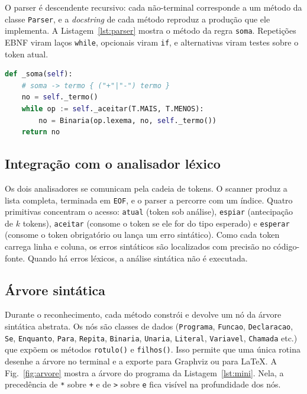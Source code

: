 \documentclass[conference]{IEEEtran}
\begin{document}
O parser é descendente recursivo: cada não-terminal corresponde a um método
da classe \texttt{Parser}, e a \textit{docstring} de cada método reproduz a produção
que ele implementa. A Listagem~\ref{lst:parser} mostra o método da regra
\texttt{soma}. Repetições EBNF viram laços \texttt{while}, opcionais viram
\texttt{if}, e alternativas viram testes sobre o token atual.

\begin{lstlisting}[language=Python,caption={Método da regra \texttt{soma} (simplificado).},label=lst:parser,numbers=none,xleftmargin=0.3em,framexleftmargin=0.2em]
def _soma(self):
    # soma -> termo { ("+"|"-") termo }
    no = self._termo()
    while op := self._aceitar(T.MAIS, T.MENOS):
        no = Binaria(op.lexema, no, self._termo())
    return no
\end{lstlisting}

\subsection{Integração com o analisador léxico}
Os dois analisadores se comunicam pela cadeia de tokens. O scanner produz a
lista completa, terminada em \texttt{EOF}, e o parser a percorre com um
índice. Quatro primitivas concentram o acesso: \texttt{atual} (token sob
análise), \texttt{espiar} (antecipação de $k$ tokens), \texttt{aceitar}
(consome o token se ele for do tipo esperado) e \texttt{esperar} (consome o
token obrigatório ou lança um erro sintático). Como cada token carrega linha
e coluna, os erros sintáticos são localizados com precisão no código-fonte.
Quando há erros léxicos, a análise sintática não é executada.

\subsection{Árvore sintática}
Durante o reconhecimento, cada método constrói e devolve um nó da árvore
sintática abstrata. Os nós são classes de dados (\texttt{Programa},
\texttt{Funcao}, \texttt{Declaracao}, \texttt{Se}, \texttt{Enquanto},
\texttt{Para}, \texttt{Repita}, \texttt{Binaria}, \texttt{Unaria},
\texttt{Literal}, \texttt{Variavel}, \texttt{Chamada} etc.) que expõem os
métodos \texttt{rotulo()} e \texttt{filhos()}. Isso permite que uma única
rotina desenhe a árvore no terminal e a exporte para Graphviz ou para
\LaTeX. A Fig.~\ref{fig:arvore} mostra a árvore do programa da
Listagem~\ref{lst:mini}. Nela, a precedência de \texttt{*} sobre \texttt{+}
e de \texttt{>} sobre \texttt{e} fica visível na profundidade dos nós.
\end{document}
